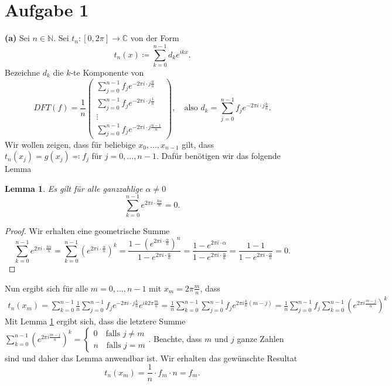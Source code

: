 \documentclass[a4paper]{extarticle}
\newtheorem{lemma}{Lemma}
\theoremstyle{named}
\begin{document}
\section*{Aufgabe 1}
\textbf{(a)} Sei $n \in \mathbb N$. Sei $t_n:[0,2\pi] \to \mathbb C$ von der Form
\[
	t_n(x) \coloneqq \sum^{n-1}_{k=0}d_ke^{ikx}.
\]
Bezeichne $d_k$ die $k$-te Komponente von
\[
	DFT(f) = \frac{1}{n}\begin{pmatrix}
	\sum_{j=0}^{n-1}f_j e^{-2\pi i \cdot j \frac{0}{n}} \\
	\sum_{j=0}^{n-1}f_j e^{-2\pi i \cdot j \frac{1}{n}} \\
	\vdots \\
	\sum_{j=0}^{n-1}f_j e^{-2\pi i \cdot j \frac{n-1}{n}} 
	\end{pmatrix}, 
	\quad \text{also }
	d_k = \sum_{j=0}^{n-1}f_j e^{-2\pi i \cdot j \frac{k}{n}}
	. 
\]
Wir wollen zeigen, dass für beliebige $x_0,...,x_{n-1}$ gilt, dass $t_n(x_j) = g(x_j) \eqqcolon f_j$ für $j=0,...,n-1$. Dafür benötigen wir das folgende Lemma
\begin{lemma}\label{kaks}
	Es gilt für alle ganzzahlige $\alpha \neq 0$ $$\sum^{n-1}_{k=0} e^{2\pi i \cdot \frac{k\alpha}{n}} = 0.$$
\end{lemma}
\begin{proof}
	Wir erhalten eine geometrische Summe
	\[
		\sum^{n-1}_{k=0} e^{2\pi i \cdot \frac{k\alpha}{n}} = \sum^{n-1}_{k=0} \left(e^{2\pi i \cdot \frac{\alpha}{n}}\right)^k = \frac{1 - (e^{2\pi i \cdot \frac{\alpha}{n}})^n}{1 - e^{2\pi i \cdot \frac{\alpha}{n}}} = \frac{1 - e^{2\pi i \cdot \alpha}}{1 - e^{2\pi i \cdot \frac{\alpha}{n}}} = \frac{1-1}{1 - e^{2\pi i \cdot \frac{\alpha}{n}}} = 0.
	\]
\end{proof}
Nun ergibt sich für alle $m=0,...,n-1$ mit $x_m = 2\pi\frac{ m}{n}$, dass
\begin{align*}
	t_n(x_m) = \sum^{n-1}_{k=0} \frac{1}{n} \sum_{j=0}^{n-1}f_j e^{-2\pi i \cdot j \frac{k}{n}} e^{ik 2\pi \frac{m}{n}} 
	= \frac{1}{n}\sum^{n-1}_{k=0} \sum^{n-1}_{j=0} f_j e^{2\pi i \frac{k}{n}(m-j)} 
	= \frac{1}{n}\sum^{n-1}_{j=0} f_j  \sum^{n-1}_{k=0} \left(e^{2\pi i \frac{m-j}{n}}\right)^k
\end{align*}
Mit Lemma \ref{kaks} ergibt sich, dass die letztere Summe $\sum^{n-1}_{k=0} \left(e^{2\pi i \frac{m-j}{n}}\right)^k = \begin{cases}
0 \quad \text{falls $j \neq m$}\\ n \quad \text{falls $j = m$}
\end{cases}$. Beachte, dass $m$ und $j$ ganze Zahlen sind und daher das Lemma anwendbar ist. Wir erhalten das gewünschte Resultat
\[
	t_n(x_m) = \frac{1}{n} \cdot  f_m \cdot n = f_m.
\]
\end{document}

